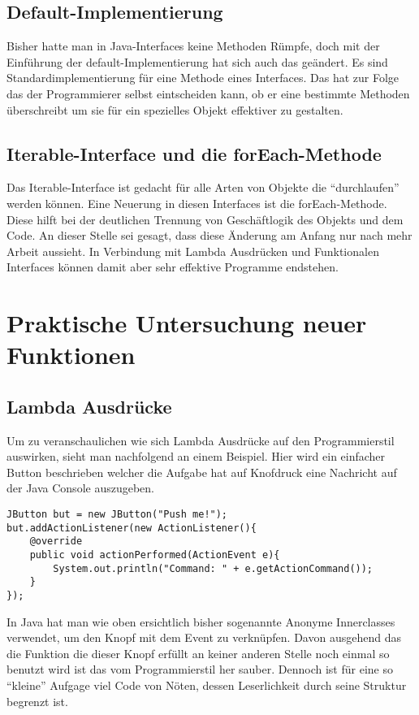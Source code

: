 \section{Default-Implementierung}
\label{sec:DI}
Bisher hatte man in Java-Interfaces keine Methoden Rümpfe, doch mit der
Einführung der default-Implementierung hat sich auch das geändert. Es sind
Standardimplementierung für eine Methode eines Interfaces. Das hat zur Folge das
der Programmierer selbst eintscheiden kann, ob er eine bestimmte Methoden
überschreibt um sie für ein spezielles Objekt effektiver zu gestalten.

\section{Iterable-Interface und die forEach-Methode}
\label{sec:IIufEM}
Das Iterable-Interface ist gedacht für alle Arten von Objekte die
"`durchlaufen"' werden können. Eine Neuerung in diesen Interfaces ist die
forEach-Methode. Diese hilft bei der deutlichen Trennung von Geschäftlogik des
Objekts und dem Code. An dieser Stelle sei gesagt, dass diese Änderung am Anfang
nur nach mehr Arbeit aussieht. In Verbindung mit Lambda Ausdrücken und
Funktionalen Interfaces können damit aber sehr effektive Programme endstehen. 


\chapter{Praktische Untersuchung neuer Funktionen}
\label{sec:Praxis}

\section{Lambda Ausdrücke}
\label{sec:Lambda}
Um zu veranschaulichen wie sich Lambda Ausdrücke auf den Programmierstil
auswirken, sieht man nachfolgend an einem Beispiel. Hier wird ein einfacher
Button beschrieben welcher die Aufgabe hat auf Knofdruck eine Nachricht auf der
Java Console auszugeben.

\lstset{language=Java}  
\begin{lstlisting}
JButton but = new JButton("Push me!");
but.addActionListener(new ActionListener(){
	@override
	public void actionPerformed(ActionEvent e){
		System.out.println("Command: " + e.getActionCommand());
	}
});
\end{lstlisting}

In Java hat man wie oben ersichtlich bisher sogenannte Anonyme Innerclasses
verwendet, um den Knopf mit dem Event zu verknüpfen. Davon ausgehend das die
Funktion die dieser Knopf erfüllt an keiner anderen Stelle noch einmal so benutzt wird ist das vom Programmierstil her
sauber. Dennoch ist für eine so "`kleine"' Aufgage viel Code von Nöten, dessen
Leserlichkeit durch seine Struktur begrenzt ist.

